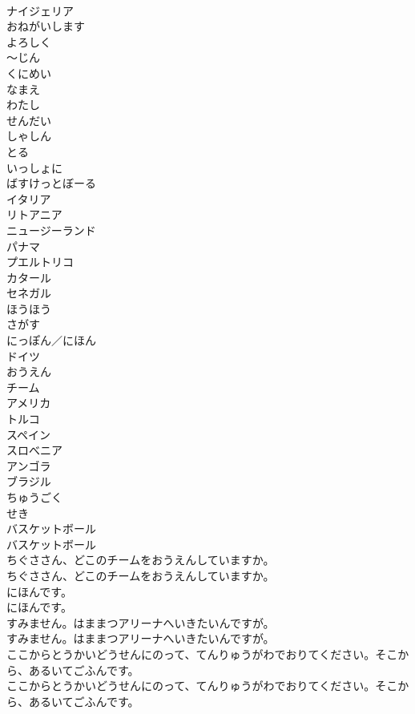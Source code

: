 \documentclass[8pt]{extreport}
\begin{document}
\begin{CJK}{UTF8}{min}
\\	ナイジェリア
\\	おねがいします
\\	よろしく
\\	～じん
\\	くにめい
\\	なまえ
\\	わたし
\\	せんだい
\\	しゃしん
\\	とる
\\	いっしょに
\\	ばすけっとぼーる
\\	イタリア
\\	リトアニア
\\	ニュージーランド
\\	パナマ
\\	プエルトリコ
\\	カタール
\\	セネガル
\\	ほうほう
\\	さがす
\\	にっぽん／にほん
\\	ドイツ
\\	おうえん
\\	チーム
\\	アメリカ
\\	トルコ
\\	スペイン
\\	スロべニア
\\	アンゴラ
\\	ブラジル
\\	ちゅうごく
\\	せき
\\	バスケットボール	
\\	バスケットボール 
\\	ちぐささん、どこのチームをおうえんしていますか。	
\\	ちぐささん、どこのチームをおうえんしていますか。 
\\	にほんです。	
\\	にほんです。 
\\	すみません。はままつアリーナへいきたいんですが。	
\\	すみません。はままつアリーナへいきたいんですが。 
\\	ここからとうかいどうせんにのって、てんりゅうがわでおりてください。そこから、あるいてごふんです。	
\\	ここからとうかいどうせんにのって、てんりゅうがわでおりてください。そこから、あるいてごふんです。 

\end{CJK}
\end{document}
